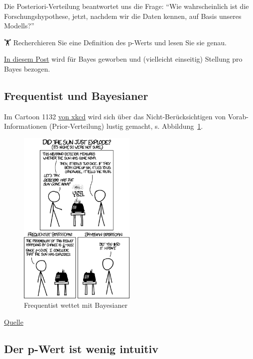\documentclass[
  a4paper,
  DIV=11]{scrreprt}
\theoremstyle{definition}
\theoremstyle{remark}
\begin{document}
Die Posteriori-Verteilung beantwortet uns die Frage: ``Wie
wahrscheinlich ist die Forschungshypothese, jetzt, nachdem wir die Daten
kennen, auf Basis unseres Modells?''

🏋 Recherchieren Sie eine Definition des p-Werts und lesen Sie sie genau.

\href{https://data-se.netlify.app/2022/01/27/warum-bayes/}{In diesem
Post} wird für Bayes geworben und (vielleicht einseitig) Stellung pro
Bayes bezogen.

\hypertarget{frequentist-und-bayesianer}{%
\subsection{Frequentist und
Bayesianer}\label{frequentist-und-bayesianer}}

Im Cartoon 1132 \href{https://xkcd.com/}{von xkcd} wird sich über das
Nicht-Berücksichtigen von Vorab-Informationen (Prior-Verteilung) lustig
gemacht, s. Abbildung~\ref{fig-xkcd-bayes}.

\begin{figure}

{\centering \includegraphics[width=0.5\textwidth,height=\textheight]{./img/frequentists_vs_bayesians_2x.png}

}

\caption{\label{fig-xkcd-bayes}Frequentist wettet mit Bayesianer}

\end{figure}

\href{https://xkcd.com/1132/}{Quelle}

\hypertarget{der-p-wert-ist-wenig-intuitiv}{%
\subsection{Der p-Wert ist wenig
intuitiv}\label{der-p-wert-ist-wenig-intuitiv}}
\end{document}
